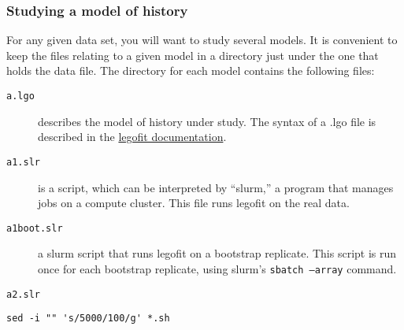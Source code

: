 \documentclass[11pt]{article}
\begin{document}
\subsubsection{Studying a model of history}
For any given data set, you will want to study several models. It is
convenient to keep the files relating to a given model in a directory
just under the one that holds the data file. The directory for each
model contains the following files:
\begin{description}
  \item[\texttt{a.lgo}] describes the model of history
under study. The syntax of a .lgo file is described in the
\href{http://alanrogers.github.io/legofit/html/index.html#lgo}{legofit
  documentation}.
  \item[\texttt{a1.slr}] is a script, which can be interpreted by
    ``slurm,'' a program that manages jobs on a compute cluster. This
    file runs legofit on the real data.
  \item[\texttt{a1boot.slr}] a slurm script that runs legofit on a
    bootstrap replicate. This script is run once for each bootstrap
    replicate, using slurm's \texttt{sbatch --array} command.
  \item[\texttt{a2.slr}]
\end{description}    

\begin{verbatim}
sed -i "" 's/5000/100/g' *.sh 
\end{verbatim}

\printbibliography
\end{document}
